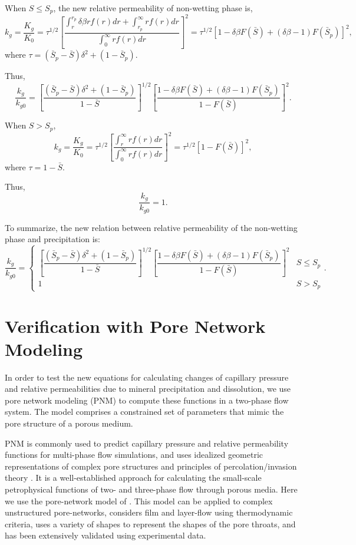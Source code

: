 \documentclass[preprint,12pt,authoryear]{elsarticle}
\begin{document}
When $S\leq S_p$, the new relative permeability of non-wetting phase is,
\begin{equation}
k_g=\dfrac{K_g}{K_0}=\tau^{1/2}[\dfrac{\int_r^{r_p} \delta\beta rf(r)dr + \int_{r_p}^\infty rf(r)dr}{\int_0^\infty rf(r)dr}]^2=\tau^{1/2}[1-\delta\beta F(\bar{S})+(\delta\beta -1)F(\bar{S}_p)]^2,
\end{equation}
where $\tau=(\bar{S}_p-\bar{S})\delta^2+(1-\bar{S}_p)$.

Thus,
\begin{equation}
\dfrac{k_g}{k_{g0}}=[\dfrac{(\bar{S}_p-\bar{S})\delta^2+(1-\bar{S}_p)}{1-\bar{S}}]^{1/2}[\dfrac{1-\delta\beta F(\bar{S})+(\delta\beta -1)F(\bar{S}_p)}{1-F(\bar{S})}]^2.
\end{equation}

When $S>S_p$, 
\begin{equation}
k_{g}=\dfrac{K_{g}}{K_0}=\tau^{1/2}[\dfrac{\int_r^\infty rf(r)dr}{\int_0^\infty rf(r)dr}]^2=\tau^{1/2}[1-F(\bar{S})]^2,
\end{equation} 
where $\tau=1-\bar{S}$.

Thus,
\begin{equation}
\dfrac{k_g}{k_{g0}}=1.
\end{equation}

To summarize, the new relation between relative permeability of the non-wetting phase and precipitation is:
\begin{equation}
\label{eq:KrgPcp}
\dfrac{k_g}{k_{g0}}= \begin{cases}
[\dfrac{(\bar{S}_p-\bar{S})\delta^2+(1-\bar{S}_p)}{1-\bar{S}}]^{1/2}[\dfrac{1-\delta\beta F(\bar{S})+(\delta\beta -1)F(\bar{S}_p)}{1-F(\bar{S})}]^2 &S\leq S_p \\
1 & S>S_p
\end{cases}.
\end{equation}

\section{Verification with Pore Network Modeling}
\label{S:4}

In order to test the new equations for calculating changes of capillary pressure and relative permeabilities due to mineral precipitation and dissolution, we use pore network modeling (PNM) to compute these functions in a two-phase flow system. The model comprises a constrained set of parameters that mimic the pore structure of a porous medium. 

PNM is commonly used to predict capillary pressure and relative permeability functions for multi-phase flow simulations, and uses idealized geometric representations of complex pore structures and principles of percolation/invasion theory \citep{blunt2001flow,blunt2013pore}. It is a well-established approach for calculating the small-scale petrophysical functions of two- and three-phase flow through porous media. Here we use the pore-network model of \cite{ryazanov2009two}. This model can be applied to complex unstructured pore-networks, considers film and layer-flow using thermodynamic criteria, uses a variety of shapes to represent the shapes of the pore throats, and has been extensively validated using experimental data.
\end{document}
